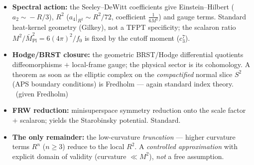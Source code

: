 \documentclass[11pt,a4paper]{article}
\newcommand{\Mbar}{\bar M_{\mathrm{Pl}}}
\newcommand{\cthree}{c_3}
\theoremstyle{definition}
\begin{document}
\begin{center}
\end{center}

\begin{itemize}[leftmargin=1.4em]
\item \textbf{Spectral action:} the Seeley--DeWitt coefficients give Einstein--Hilbert
      ($a_2\!\sim\!-R/3$), $R^2$ ($a_4|_{R^2}\!\sim\!R^2/72$, coefficient $\tfrac1{6M^2}$) and gauge terms.
      Standard heat-kernel geometry (Gilkey), not a TFPT specificity; the scalaron ratio
      $M^2/\Mbar^2=6(4\pi)^2/f_0$ is fixed by the cutoff moment ($\cthree^7$). \mE\
\item \textbf{Hodge/BRST closure:} the geometric BRST/Hodge differential quotients diffeomorphisms $+$
      local-frame gauge; the physical sector is its cohomology. A theorem as soon as the elliptic
      complex on the \emph{compactified} normal slice $S^2$ (APS boundary conditions) is
      Fredholm --- again standard index theory. \mE\ (given Fredholm)
\item \textbf{FRW reduction:} minisuperspace symmetry reduction onto the scale factor $+$ scalaron;
      yields the Starobinsky potential. Standard. \mE
\item \textbf{The only remainder:} the low-curvature \emph{truncation} --- higher curvature terms
      $R^n$ ($n\!\ge\!3$) reduce to the local $R^2$. A \emph{controlled approximation} with explicit
      domain of validity (curvature $\ll M^2$), \emph{not} a free assumption.
\end{itemize}
\end{document}
